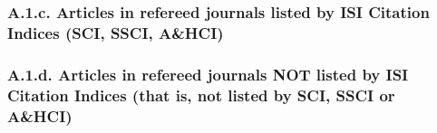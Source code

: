 \documentclass[10pt]{article}
\newcommand{\junk}[1]{}
\begin{document}
\junk{

\subsubsection*{A.1.a. Books, textbooks, scholarly monographs written by the faculty member}


}

\junk{
\subsubsection*{A.1.b. Volumes (books, anthologies, collections, bibliographies) edited by the faculty member (excluding conference proceedings)}



}

\subsubsection*{A.1.c. Articles in refereed journals listed by ISI Citation Indices (SCI, SSCI, A\&HCI)}




\subsubsection*{A.1.d. Articles in refereed journals NOT listed by ISI Citation Indices (that is, not listed by SCI, SSCI or A\&HCI)}



\junk{

\subsubsection*{A.1.e. Chapters in books or monographs excluding conference proceedings}



}

\junk{
\subsubsection*{A.1.f. Book reviews, theater reviews, editorials}


}

\junk{
\subsubsection*{A.1.g. Reprints or Translations of Previous or Concurrent Publications}


}
\end{document}
